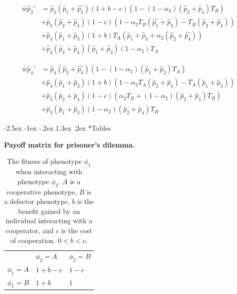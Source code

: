 \documentclass[12pt]{extarticle}
\makeatletter
\renewcommand\section{\@startsection {section}{1}{\z@}%
     {-2.5ex \@plus -1ex \@minus -.2ex}%
     {1.3ex \@plus.2ex}%
    {\Large\bfseries}}
\makeatother
\begin{document}
{\begin{appendices}
\begin{equation} \label{eq:next_gen_p_3}
  \begin{aligned}
  \bar{w}\hat{p}_3' & = \hat{p}_3(\hat{p}_1+\hat{p_3})(1+b-c)(1 - (1-\alpha_2)(\hat{p}_2 + \hat{p}_4)T_B) \\
  &+ \hat{p}_3(\hat{p}_2 + \hat{p}_4)(1-c)(1-\alpha_2T_B(\hat{p_1}+\hat{p}_3) - T_B(\hat{p}_2+\hat{p}_4)) \\
  &+ \hat{p}_4(\hat{p}_1 + \hat{p}_3)(1+b)T_A(\hat{p}_1 + \hat{p}_3 + \alpha_2(\hat{p}_2 + \hat{p_4})) \\
  &+ \hat{p}_4(\hat{p}_2 + \hat{p}_4)(\hat{p}_1 + \hat{p}_3)(1-\alpha_2)T_A 
  \end{aligned}
\end{equation}

\begin{equation} \label{eq:next_gen_p_4}
  \begin{aligned}
  \bar{w}\hat{p}_4' & = \hat{p}_4(\hat{p}_2+\hat{p_4})(1 - (1-\alpha_2)(\hat{p}_1 + \hat{p}_3)T_A) \\
  &+ \hat{p}_4(\hat{p}_1 + \hat{p}_3)(1+b)(1-\alpha_2T_A(\hat{p}_2 + \hat{p}_4)-T_A(\hat{p}_1 + \hat{p}_3))\\
  &+ \hat{p}_3(\hat{p}_2 + \hat{p}_4)(1-c)(\alpha_2T_B + (1-\alpha_2)(\hat{p}_2+\hat{p}_4)T_B) \\
  &+ \hat{p}_3(\hat{p}_1 + \hat{p}_3)(1-\alpha_2)(\hat{p}_2+\hat{p}_4)T_B 
  \end{aligned}
\end{equation}

\end{appendices}






\newpage

\section*{Tables}

\bigskip
\begin{table}[h]
\centering
\caption{\textbf{Payoff matrix for prisoner's dilemma.}}
\begin{tabular}{lll}
\toprule
           & $\phi_2=A$ & $\phi_2=B$ \\ \cmidrule(r){1-3}
$\phi_1=A$ & $1+b-c$ & $1-c$ \\
$\phi_1=B$ & $1+b$   & $1$
\\ \bottomrule
\end{tabular}
\label{table:prisoner_payoff}
\caption*{
The fitness of phenotype $\phi_1$ when interacting with phenotype $\phi_2$. $A$ is a cooperative phenotype, $B$ is a defector phenotype, $b$ is the benefit gained by an individual interacting with a cooperator, and $c$ is the cost of cooperation. $0<b<c$.
}
\end{table}
\bigskip

}
\end{document}
